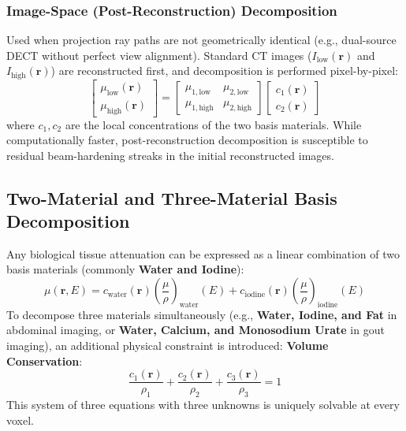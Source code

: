 \documentclass[11pt,a4paper]{article}
\begin{document}
\subsubsection{Image-Space (Post-Reconstruction) Decomposition}
Used when projection ray paths are not geometrically identical (e.g., dual-source DECT without perfect view alignment). Standard CT images ($I_{\text{low}}(\mathbf{r})$ and $I_{\text{high}}(\mathbf{r})$) are reconstructed first, and decomposition is performed pixel-by-pixel:
\begin{equation}
    \begin{bmatrix} \mu_{\text{low}}(\mathbf{r}) \\ \mu_{\text{high}}(\mathbf{r}) \end{bmatrix} = \begin{bmatrix} \mu_{1, \text{low}} & \mu_{2, \text{low}} \\ \mu_{1, \text{high}} & \mu_{2, \text{high}} \end{bmatrix} \begin{bmatrix} c_1(\mathbf{r}) \\ c_2(\mathbf{r}) \end{bmatrix}
\end{equation}
where $c_1, c_2$ are the local concentrations of the two basis materials. While computationally faster, post-reconstruction decomposition is susceptible to residual beam-hardening streaks in the initial reconstructed images.

\subsection{Two-Material and Three-Material Basis Decomposition}
Any biological tissue attenuation can be expressed as a linear combination of two basis materials (commonly \textbf{Water and Iodine}):
\begin{equation}
    \mu(\mathbf{r}, E) = c_{\text{water}}(\mathbf{r}) \left( \frac{\mu}{\rho} \right)_{\text{water}}(E) + c_{\text{iodine}}(\mathbf{r}) \left( \frac{\mu}{\rho} \right)_{\text{iodine}}(E)
\end{equation}
To decompose three materials simultaneously (e.g., \textbf{Water, Iodine, and Fat} in abdominal imaging, or \textbf{Water, Calcium, and Monosodium Urate} in gout imaging), an additional physical constraint is introduced: \textbf{Volume Conservation}:
\begin{equation}
    \frac{c_1(\mathbf{r})}{\rho_1} + \frac{c_2(\mathbf{r})}{\rho_2} + \frac{c_3(\mathbf{r})}{\rho_3} = 1
\end{equation}
This system of three equations with three unknowns is uniquely solvable at every voxel.
\end{document}
